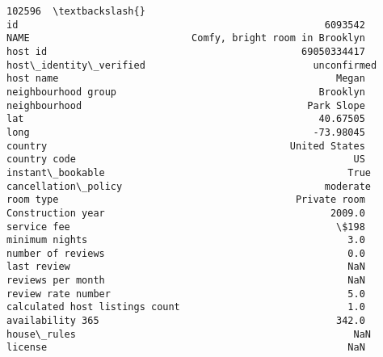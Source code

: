 \documentclass[11pt]{article}
\begin{document}
\begin{tcolorbox}[breakable, size=fbox, boxrule=.5pt, pad at break*=1mm, opacityfill=0]
\begin{Verbatim}[commandchars=\\\{\}]
                                                        102596  \textbackslash{}
id                                                     6093542
NAME                            Comfy, bright room in Brooklyn
host id                                            69050334417
host\_identity\_verified                             unconfirmed
host name                                                Megan
neighbourhood group                                   Brooklyn
neighbourhood                                       Park Slope
lat                                                   40.67505
long                                                 -73.98045
country                                          United States
country code                                                US
instant\_bookable                                          True
cancellation\_policy                                   moderate
room type                                         Private room
Construction year                                       2009.0
service fee                                              \$198
minimum nights                                             3.0
number of reviews                                          0.0
last review                                                NaN
reviews per month                                          NaN
review rate number                                         5.0
calculated host listings count                             1.0
availability 365                                         342.0
house\_rules                                                NaN
license                                                    NaN


\end{Verbatim}
\end{tcolorbox}
\end{document}
